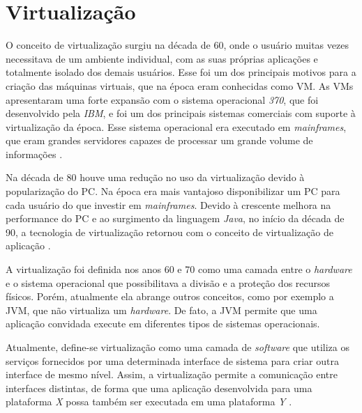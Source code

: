\chapter{Virtualização}
\label{cap:virtualizacao}

O conceito de virtualização surgiu na década de 60, onde o usuário muitas vezes necessitava de um ambiente individual, com as suas próprias 
aplicações e totalmente isolado dos demais usuários. Esse foi um dos principais motivos para a criação das máquinas virtuais, que na época 
eram conhecidas como \ac{VM}. As \acp{VM} apresentaram uma forte expansão com o sistema operacional \textit{370}, que foi 
desenvolvido pela \textit{IBM}, e foi um dos principais sistemas comerciais com suporte à virtualização da época. Esse sistema operacional 
era executado em \textit{mainframes}, que eram grandes servidores capazes de processar um grande volume de informações \cite{laureano2008}. 

Na década de 80 houve uma redução no uso da virtualização devido à popularização do \ac{PC}. Na época era mais vantajoso disponibilizar 
um \ac{PC} para cada usuário do que investir em \textit{mainframes}. Devido à crescente melhora na performance do \ac{PC} e
ao surgimento da linguagem \textit{Java}, no início da década de 90, a tecnologia de virtualização retornou com o conceito de virtualização
de aplicação \cite{laureano2008}.

A virtualização foi definida nos anos 60 e 70 como uma camada entre o \textit{hardware} e o sistema operacional que possibilitava a 
divisão e a proteção dos recursos físicos. Porém, atualmente ela abrange outros conceitos, como por exemplo a \ac{JVM}, que não virtualiza
um \textit{hardware}. De fato, a \ac{JVM} permite que uma aplicação convidada execute em diferentes tipos de sistemas operacionais.

Atualmente, define-se virtualização como uma camada de \textit{software} que utiliza os serviços fornecidos por uma determinada interface de 
sistema para criar outra interface de mesmo nível. Assim, a virtualização permite a comunicação entre interfaces distintas, de forma que uma 
aplicação desenvolvida para uma plataforma \textit{X} possa também ser executada em uma plataforma \textit{Y} \cite{laureano2008}.


